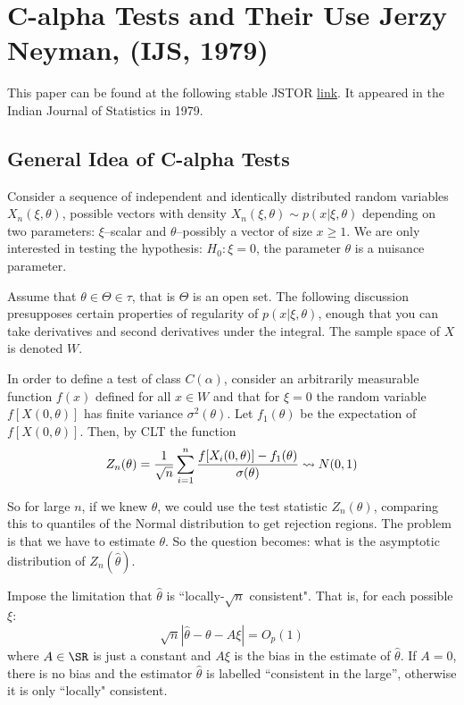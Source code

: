 \section{C-alpha Tests and Their Use {\small Jerzy Neyman, (IJS, 1979)}}


This paper can be found at the following stable JSTOR \href{https://www.jstor.org/stable/25050174}{link}. It appeared in the Indian Journal of Statistics in 1979.  

\subsection{General Idea of C-alpha Tests}%
\label{subsec:neyman-2}

Consider a sequence of independent and identically distributed random variables \(X_n(\xi,\theta)\), possible vectors with density \(X_n(\xi,\theta) \sim p(x|\xi,\theta)\) depending on two parameters: \(\xi\)--scalar and \(\theta\)--possibly a vector of size \(x \geq 1\). We are only interested in testing the hypothesis: \(H_0:\xi=0\), the parameter \(\theta\) is a nuisance parameter.

Assume that \(\theta \in \Theta \in \tau\), that is  \(\Theta\) is an open set. The following discussion presupposes certain properties of regularity of \(p(x|\xi,\theta)\), enough that you can take derivatives and second derivatives under the integral. The sample space of \(X\) is denoted \(W\). 

In order to define a test of class \(C(\alpha)\), consider an arbitrarily measurable function  \(f(x)\) defined for all  \(x\in W\) and that for \(\xi=0\) the random variable \(f[X(0,\theta)]\) has finite variance \(\sigma^2(\theta)\). Let \(f_1(\theta)\) be the expectation of \(f[X(0,\theta)]\). Then, by CLT the function
\begin{equation}
	\label{eq:neyman-1}
	Z_n(\theta) = \frac{1}{\sqrt{n}} \sum_{i=1}^n \frac{f[X_i(0,\theta)]-f_1(\theta)}{\sigma(\theta)}  \rightsquigarrow N(0,1)
\end{equation}

So for large \(n\), if we knew \(\theta\), we could use the test statistic  \(Z_n(\theta)\), comparing this to quantiles of the  Normal distribution to get rejection regions. The problem is that we have to estimate \(\theta\). So the question becomes: what is the asymptotic distribution of \(Z_n(\hat \theta)\).

Impose the limitation that \(\hat\theta\) is ``locally-\(\sqrt{n}\) consistent". That is, for each possible \(\xi\):
\begin{equation}
	\label{eq:neyman-3}
	\sqrt{n}\left|\hat\theta-\theta-A\xi\right| = O_p(1)
\end{equation}
where \(A \in \SR\) is just a constant and \(A\xi\) is the bias in the estimate of \(\hat\theta\). If \(A=0\), there is no bias and the estimator \(\hat\theta\) is labelled ``consistent in the large'', otherwise it is only ``locally" consistent.

